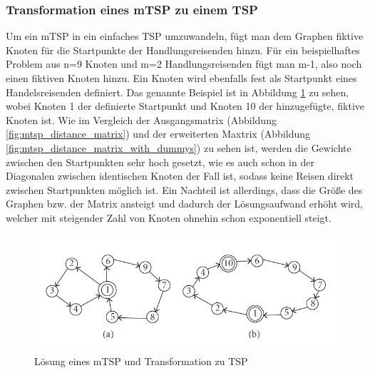 \subsubsection{Transformation eines mTSP zu einem TSP}
\label{sec:mstpTransofrmation}

Um ein mTSP in ein einfaches TSP umzuwandeln, fügt man dem Graphen fiktive Knoten für die Startpunkte der Handlungsreisenden hinzu. Für ein beispielhaftes Problem aus n=9 Knoten und m=2 Handlungsreisenden fügt man m-1, also noch einen fiktiven Knoten hinzu. Ein Knoten wird ebenfalls fest als Startpunkt eines Handelsreisenden definiert. Das genannte Beispiel ist in Abbildung \ref{fig:mtsp_tranformation} zu sehen, wobei Knoten 1 der definierte Startpunkt und Knoten 10 der hinzugefügte, fiktive Knoten ist. Wie im Vergleich der Ausgangsmatrix (Abbildung \ref{fig:mtsp_distance_matrix}) und der erweiterten Maxtrix (Abbildung \ref{fig:mtsp_distance_matrix_with_dummys}) zu sehen ist, werden die Gewichte zwischen den Startpunkten sehr hoch gesetzt, wie es auch schon in der Diagonalen zwischen identischen Knoten der Fall ist, sodass keine Reisen direkt zwischen Startpunkten möglich ist. Ein Nachteil ist allerdings, dass die Größe des Graphen bzw. der Matrix ansteigt und dadurch der Lösungsaufwand erhöht wird, welcher mit steigender Zahl von Knoten ohnehin schon exponentiell steigt. \cite{mtsp, mtspTransform2}

\begin{figure}[H]
    \centering
    \includegraphics[width=\textwidth]{images/mtspTransformation.png}
    \caption{Lösung eines mTSP und Transformation zu TSP \cite{mtspTransform2}}
    \label{fig:mtsp_tranformation}
\end{figure}

